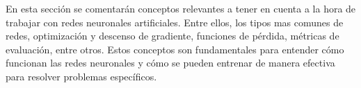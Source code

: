 En esta sección se comentarán conceptos relevantes a tener en cuenta a la hora de trabajar con redes neuronales artificiales. 
Entre ellos, los tipos mas comunes de redes, optimización y descenso de gradiente, funciones de pérdida, métricas de evaluación, entre otros. Estos conceptos son fundamentales para entender cómo funcionan las redes neuronales y cómo se pueden entrenar de manera efectiva para resolver problemas específicos.